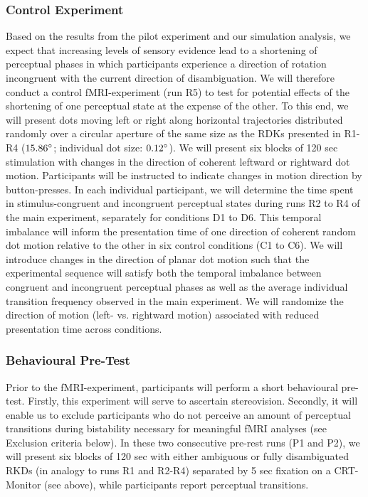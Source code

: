 \documentclass[12pt]{article}
\begin{document}
\subsubsection{Control Experiment}
Based on the results from the pilot experiment and our simulation analysis, we expect that increasing levels of sensory evidence lead to a shortening of perceptual phases in which participants experience a direction of rotation incongruent with the current direction of disambiguation. We will therefore conduct a control fMRI-experiment (run R5) to test for potential effects of the shortening of one perceptual state at the expense of the other. To this end, we will present dots moving left or right along horizontal trajectories distributed randomly over a circular aperture of the same size as the RDKs presented in R1-R4 ($15.86\degree$; individual dot size: $0.12\degree$). We will present six blocks of 120 sec stimulation with changes in the direction of coherent leftward or rightward dot motion. Participants will be instructed to indicate changes in motion direction by button-presses. In each individual participant, we will determine the time spent in stimulus-congruent and incongruent perceptual states during runs R2 to R4 of the main experiment, separately for conditions D1 to D6. This temporal imbalance will inform the presentation time of one direction of coherent random dot motion relative to the other in six control conditions (C1 to C6). We will introduce changes in the direction of planar dot motion such that the experimental sequence will satisfy both the temporal imbalance between congruent and incongruent perceptual phases as well as the average individual transition frequency observed in the main experiment. We will randomize the direction of motion (left- vs. rightward motion) associated with reduced presentation time across conditions.  

\subsubsection{Behavioural Pre-Test}
Prior to the fMRI-experiment, participants will perform a short behavioural pre-test. Firstly, this experiment will serve to ascertain stereovision. Secondly, it will enable us to exclude participants who do not perceive an amount of perceptual transitions during bistability necessary for meaningful fMRI analyses (see Exclusion criteria below).  In these two consecutive pre-rest runs (P1 and P2), we will present six blocks of 120 sec with either ambiguous or fully disambiguated RKDs (in analogy to runs R1 and R2-R4) separated by 5 sec fixation on a CRT- Monitor (see above), while participants report perceptual transitions.  
\end{document}
